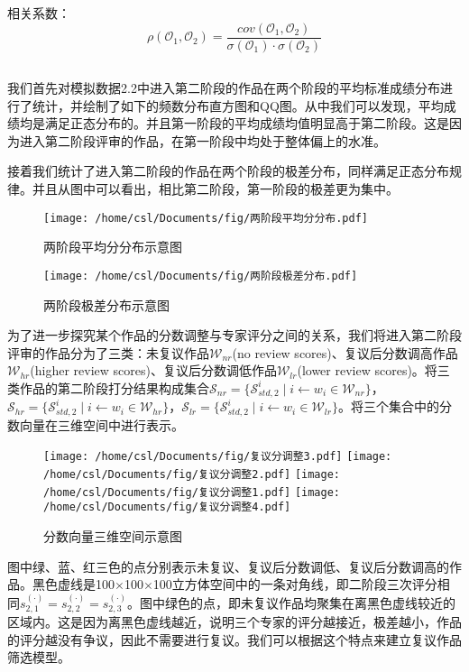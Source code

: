 \documentclass[12pt, onecolumn]{article}
\newcommand\normf{\fangsong}
\begin{document}
	相关系数：
	\begin{equation*}
	\rho\left(\mathcal{O}_1,\mathcal{O}_2 \right)=\frac{cov\left(\mathcal{O}_1,\mathcal{O}_2 \right) }{
	\sigma\left(\mathcal{O}_1\right) \cdot\sigma\left(\mathcal{O}_2 \right) 	
	}
	\end{equation*}
	
	\subsection{\normf{极差模型}}
	
	我们首先对模拟数据2.2中进入第二阶段的作品在两个阶段的平均标准成绩分布进行了统计，并绘制了如下的频数分布直方图和QQ图。从中我们可以发现，平均成绩均是满足正态分布的。并且第一阶段的平均成绩均值明显高于第二阶段。这是因为进入第二阶段评审的作品，在第一阶段中均处于整体偏上的水准。
	
	接着我们统计了进入第二阶段的作品在两个阶段的极差分布，同样满足正态分布规律。并且从图中可以看出，相比第二阶段，第一阶段的极差更为集中。
	\begin{figure}[h]
		\centering
		\texttt{[image: /home/csl/Documents/fig/两阶段平均分分布.pdf]}
		\caption{\normf 两阶段平均分分布示意图}
	\end{figure}

    
	\begin{figure}[h]
		\centering
		\texttt{[image: /home/csl/Documents/fig/两阶段极差分布.pdf]}
		\caption{\normf 两阶段极差分布示意图}
	\end{figure}

    为了进一步探究某个作品的分数调整与专家评分之间的关系，我们将进入第二阶段评审的作品分为了三类：未复议作品$\mathcal{W}_{nr}$(no review scores)、复议后分数调高作品$\mathcal{W}_{hr}$(higher review scores)、复议后分数调低作品$\mathcal{W}_{lr}$(lower review scores)。将三类作品的第二阶段打分结果构成集合$\mathcal{S}_{nr}=\{\mathcal{S}^i_{std,2}\;\vert\; i\gets w_i\in\mathcal{W}_{nr}\}$，$\mathcal{S}_{hr}=\{\mathcal{S}^i_{std,2}\;\vert\; i\gets w_i\in\mathcal{W}_{hr}\}$，$\mathcal{S}_{lr}=\{\mathcal{S}^i_{std,2}\;\vert\; i\gets w_i\in\mathcal{W}_{lr}\}$。将三个集合中的分数向量在三维空间中进行表示。


	\begin{figure}[h]
		\centering
		\texttt{[image: /home/csl/Documents/fig/复议分调整3.pdf]}
		\texttt{[image: /home/csl/Documents/fig/复议分调整2.pdf]}
		\texttt{[image: /home/csl/Documents/fig/复议分调整1.pdf]}
		\texttt{[image: /home/csl/Documents/fig/复议分调整4.pdf]}
		\caption{\normf 分数向量三维空间示意图}
	\end{figure}
	图中绿、蓝、红三色的点分别表示未复议、复议后分数调低、复议后分数调高的作品。黑色虚线是100$\times$100$\times$100立方体空间中的一条对角线，即二阶段三次评分相同$s^{(\cdot)}_{2,1}=s^{(\cdot)}_{2,2}=s^{(\cdot)}_{2,3}$。图中绿色的点，即未复议作品均聚集在离黑色虚线较近的区域内。这是因为离黑色虚线越近，说明三个专家的评分越接近，极差越小，作品的评分越没有争议，因此不需要进行复议。我们可以根据这个特点来建立复议作品筛选模型。
	
\end{document}
